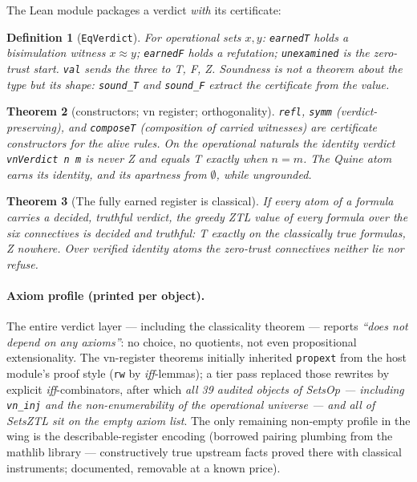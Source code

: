 \documentclass[11pt]{article}
\newtheorem{thm}{Theorem}[section]
\newtheorem{defn}[thm]{Definition}
\theoremstyle{remark}
\newcommand{\eq}{\approx}
\newcommand{\vT}{\textsf{T}}
\newcommand{\vF}{\textsf{F}}
\newcommand{\vZ}{\textsf{Z}}
\begin{document}
The Lean module packages a verdict \emph{with} its certificate:

\begin{defn}[\texttt{EqVerdict}]
For operational sets $x, y$: \texttt{earnedT} holds a bisimulation witness
$x \eq y$; \texttt{earnedF} holds a refutation; \texttt{unexamined} is the
zero-trust start. \texttt{val} sends the three to \vT, \vF, \vZ. Soundness
is not a theorem about the type but its shape: \texttt{sound\_T} and
\texttt{sound\_F} \emph{extract} the certificate from the value.
\end{defn}

\begin{thm}[constructors; vn register; orthogonality]
\texttt{refl}, \texttt{symm} (verdict-preserving), and \texttt{composeT}
(composition of carried witnesses) are certificate constructors for the
alive rules. On the operational naturals the identity verdict
\texttt{vnVerdict n m} is never \vZ{} and equals \vT{} exactly when $n=m$.
The Quine atom earns its identity, and its apartness from $\emptyset$,
while ungrounded.
\end{thm}

\begin{thm}[The fully earned register is classical]
If every atom of a formula carries a decided, truthful verdict, the greedy
ZTL value of every formula over the six connectives is decided and
truthful: \vT{} exactly on the classically true formulas, \vZ{} nowhere.
Over verified identity atoms the zero-trust connectives neither lie nor
refuse.
\end{thm}

\paragraph{Axiom profile (printed per object).} The entire verdict layer ---
including the classicality theorem --- reports \emph{``does not depend on
any axioms''}: no choice, no quotients, not even propositional
extensionality. The vn-register theorems initially inherited
\texttt{propext} from the host module's proof style (\texttt{rw} by
\emph{iff}-lemmas); a tier pass replaced those rewrites by explicit
\emph{iff}-combinators, after which \emph{all 39 audited objects of
\textsf{SetsOp} --- including \texttt{vn\_inj} and the non-enumerability of
the operational universe --- and all of \textsf{SetsZTL} sit on the empty
axiom list}. The only remaining non-empty profile in the wing is the
describable-register encoding (borrowed pairing plumbing from the mathlib
library --- constructively true upstream facts proved there with classical
instruments; documented, removable at a known price).
\end{document}
